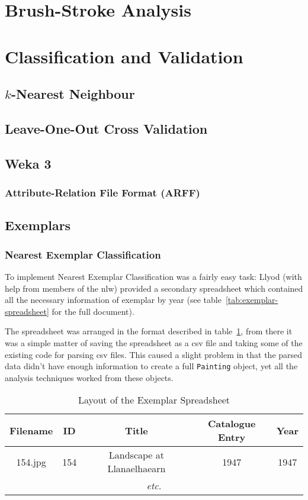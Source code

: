 \section{Brush-Stroke Analysis}


\section{Classification and Validation}

\subsection{$k$-Nearest Neighbour}

\subsection{Leave-One-Out Cross Validation}

\subsection{Weka 3}
\subsubsection{Attribute-Relation File Format (ARFF)}

\subsection{Exemplars}
\subsubsection{Nearest Exemplar Classification}
To implement Nearest Exemplar Classification was a fairly easy task: Llyod (with help from members
of the \gls{nlw}) provided a secondary spreadsheet which contained all the necessary information 
of exemplar by year (see table~\ref{tab:exemplar-spreadsheet} for the full document).

The spreadsheet was arranged in the format described in table~\ref{tab:exemplar-layout}, from
there it was a simple matter of saving the spreadsheet as a \gls{csv} file and taking some of the
existing code for parsing \gls{csv} files. This caused a slight problem in that the parsed data
didn't have enough information to create a full \texttt{Painting} object, yet all the analysis
techniques worked from these objects.

\begin{table}[h]
\centering
\begin{tabular}{|c|c|c|c|c|} \hline
Filename & ID  & Title                      & Catalogue Entry & Year \\\hline
154.jpg  & 154 & Landscape at Llanaelhaearn & 1947            & 1947 \\\hline
\multicolumn{5}{|c|}{\textit{etc.}}\\\hline
\end{tabular}
\caption{Layout of the Exemplar Spreadsheet}\label{tab:exemplar-layout}
\end{table}

